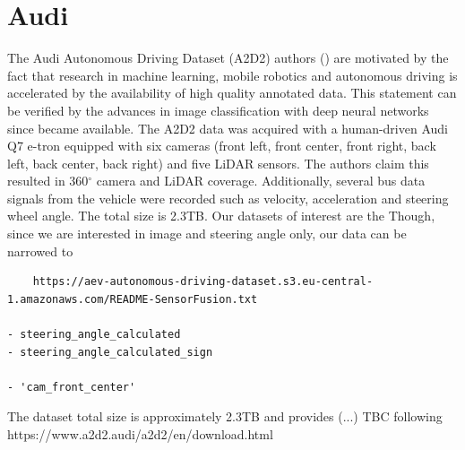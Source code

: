 \section{Audi}

The  Audi Autonomous Driving Dataset (A2D2)
authors (\cite{geyer2020a2d2}) are motivated by the fact that research in machine learning, mobile robotics and autonomous driving is accelerated by the availability of high quality annotated data. This statement can be verified by the advances in image classification with deep neural networks since \cite{IMAGENET} became available.  
The A2D2 data was acquired with a human-driven Audi Q7 e-tron equipped with six cameras (front left, front center, front right, back left, back center, back right) and five LiDAR sensors. The authors claim this resulted in  360$^{\circ}$ camera and LiDAR coverage. Additionally, several bus data signals from the vehicle were recorded such as velocity, acceleration and steering wheel angle. 
The total size is 2.3TB. Our datasets of interest are the  Though, since we are interested in image and steering angle only, our data can be narrowed to 
\begin{verbatim}
    https://aev-autonomous-driving-dataset.s3.eu-central-1.amazonaws.com/README-SensorFusion.txt
    
- steering_angle_calculated
- steering_angle_calculated_sign

- 'cam_front_center'
\end{verbatim}

The dataset total size is approximately 2.3TB and provides (...) TBC following https://www.a2d2.audi/a2d2/en/download.html

